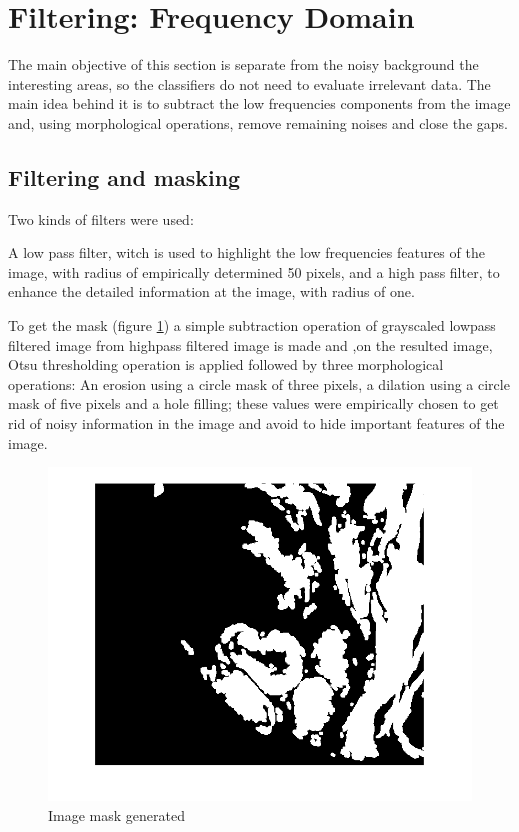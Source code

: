 \documentclass[conference]{IEEEtran}
\begin{document}
\section{Filtering: Frequency Domain}
\par The main objective of this section is separate from the noisy background the interesting areas, so the classifiers do not need to evaluate irrelevant data.
The main idea behind it is to subtract the low frequencies components from the image and, using morphological operations, remove remaining noises and close the gaps.
\subsection{Filtering and masking}
	Two kinds of filters were used:
	\par A low pass filter, witch is used to highlight the low frequencies features of the image, with radius of  empirically determined 50 pixels, and a high pass filter, to enhance the detailed information at the image, with  radius of one.
	
	\par To get the mask (figure \ref{fig:mask}) a simple subtraction operation of grayscaled lowpass filtered image from highpass filtered image is made and ,on the resulted image, Otsu thresholding operation is applied followed by three morphological operations: An erosion using a circle mask of three pixels, a dilation using a circle mask of five pixels and a hole filling; these values were empirically chosen to get rid of noisy information in the image and avoid to hide important features of the image.
	
	\begin{figure}[h]
		\centering
		\includegraphics[width=0.7\linewidth]{images/fourrierFiltering/mask}
		\caption{Image mask generated}
		\label{fig:mask}
	\end{figure}
\end{document}
